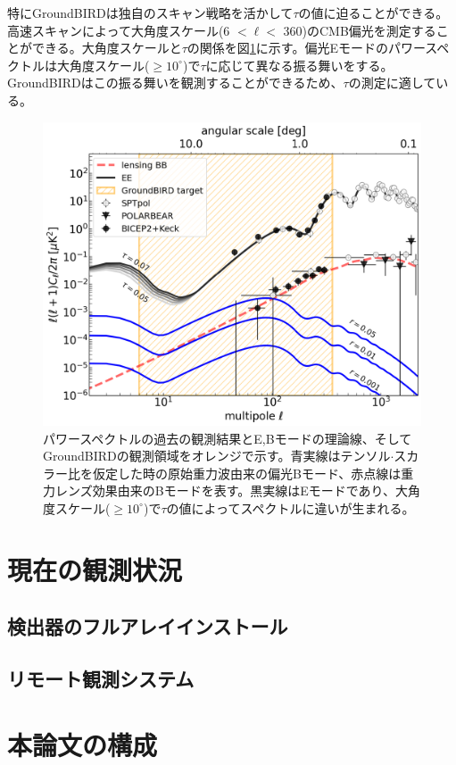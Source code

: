 特にGroundBIRDは独自のスキャン戦略を活かして$\tau$の値に迫ることができる。高速スキャンによって大角度スケール(6 $<\ell<$ 360)のCMB偏光を測定することができる。大角度スケールと$\tau$の関係を図\ref{cl_honda}に示す。偏光Eモードのパワースペクトルは大角度スケール($\geq 10^{\circ}$)で$\tau$に応じて異なる振る舞いをする。GroundBIRDはこの振る舞いを観測することができるため、$\tau$の測定に適している。

\begin{figure}[htbp]
  \centering
  \includegraphics[width=0.8\columnwidth]{3_GB/figs/cl_shonda.pdf}
  \caption{パワースペクトルの過去の観測結果とE,Bモードの理論線、そしてGroundBIRDの観測領域\cite{spie_honda}をオレンジで示す。青実線はテンソル$\cdot$スカラー比を仮定した時の原始重力波由来の偏光Bモード、赤点線は重力レンズ効果由来のBモードを表す。黒実線はEモードであり、大角度スケール($\geq 10^{\circ}$)で$\tau$の値によってスペクトルに違いが生まれる。}
  \label{cl_honda}
\end{figure}

\section{現在の観測状況}

\subsection{検出器のフルアレイインストール}

\subsection{リモート観測システム}

\section{本論文の構成}
